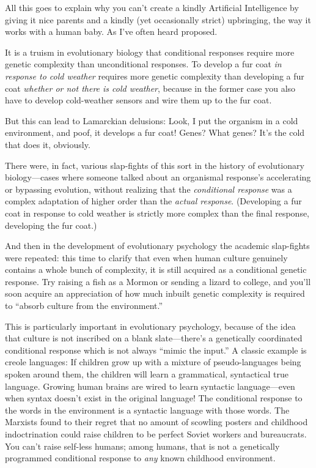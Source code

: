 {
 All this goes to explain why you can't create a
kindly Artificial Intelligence by giving it nice parents and a kindly
(yet occasionally strict) upbringing, the way it works with a human
baby. As I've often heard proposed.}

{
 It is a truism in evolutionary biology that conditional responses
require more genetic complexity than unconditional responses. To
develop a fur coat \textit{in response to cold weather} requires more
genetic complexity than developing a fur coat \textit{whether or not
there is cold weather}, because in the former case you also have to
develop cold-weather sensors and wire them up to the fur coat.}

{
 But this can lead to Lamarckian delusions: Look, I put the
organism in a cold environment, and poof, it develops a fur coat!
Genes? What genes? It's the cold that does it,
obviously.}

{
 There were, in fact, various slap-fights of this sort in the
history of evolutionary biology---cases where someone talked about an
organismal response's accelerating or bypassing
evolution, without realizing that the \textit{conditional response} was
a complex adaptation of higher order than the \textit{actual response}.
(Developing a fur coat in response to cold weather is strictly more
complex than the final response, developing the fur coat.)}

{
 And then in the development of evolutionary psychology the
academic slap-fights were repeated: this time to clarify that even when
human culture genuinely contains a whole bunch of complexity, it is
still acquired as a conditional genetic response. Try raising a fish as
a Mormon or sending a lizard to college, and you'll
soon acquire an appreciation of how much inbuilt genetic complexity is
required to ``absorb culture from the
environment.''}

{
 This is particularly important in evolutionary psychology, because
of the idea that culture is not inscribed on a blank
slate---there's a genetically coordinated conditional
response which is not always ``mimic the
input.'' A classic example is creole languages: If
children grow up with a mixture of pseudo-languages being spoken around
them, the children will learn a grammatical, syntactical true language.
Growing human brains are wired to learn syntactic language---even when
syntax doesn't exist in the original language! The
conditional response to the words in the environment is a syntactic
language with those words. The Marxists found to their regret that no
amount of scowling posters and childhood indoctrination could raise
children to be perfect Soviet workers and bureaucrats. You
can't raise self-less humans; among humans, that is not
a genetically programmed conditional response to \textit{any} known
childhood environment.}

